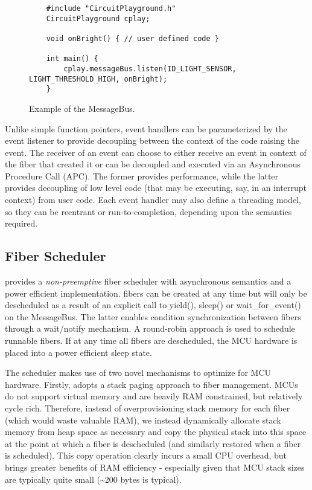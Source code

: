 \begin{figure}[t]
    \begin{lstlisting}
    #include "CircuitPlayground.h"
    CircuitPlayground cplay;

    void onBright() { // user defined code }

    int main() {
        cplay.messageBus.listen(ID_LIGHT_SENSOR, LIGHT_THRESHOLD_HIGH, onBright);
    }
    \end{lstlisting}
    \caption{\label{fig:messageBus}Example of the \CO MessageBus.}
\end{figure}

Unlike simple function pointers, \CO event handlers can be parameterized by the event listener to provide decoupling between the context of the code raising the event. The receiver of an event can choose to either receive an event in context of the fiber that created it or can be decoupled and executed via an Asynchronous Procedure Call (APC). The former provides performance, while the latter provides decoupling of low level code (that may be executing, say, in an interrupt context) from user code. Each event handler may also define a threading model, so they can be reentrant or run-to-completion, depending upon the semantics required.

\subsection{Fiber Scheduler}
\CO provides a \emph{non-preemptive} fiber scheduler with asynchronous semantics and a power efficient implementation. \CO fibers can be created at any time but will only be descheduled as a result of an explicit call to yield(), sleep() or wait\_for\_event() on the MessageBus. The latter enables condition synchronization between fibers through a wait/notify mechanism. A round-robin approach is used to schedule runnable fibers. If at any time all fibers are descheduled, the MCU hardware is placed into a power efficient sleep state.

The \CO scheduler makes use of two novel mechanisms to optimize for MCU hardware. Firstly, \CO adopts a stack paging approach to fiber management. MCUs do not support virtual memory and are heavily RAM constrained, but relatively cycle rich. Therefore, instead of overprovisioning stack memory for each fiber (which would waste valuable RAM), we instead dynamically allocate stack memory from heap space as necessary and copy the physical stack into this space at the point at which a fiber is descheduled (and similarly restored when a fiber is scheduled). This copy operation clearly incurs a small CPU overhead, but brings greater benefits of RAM efficiency - especially given that MCU stack sizes are typically quite small (\textasciitilde200 bytes is typical).

